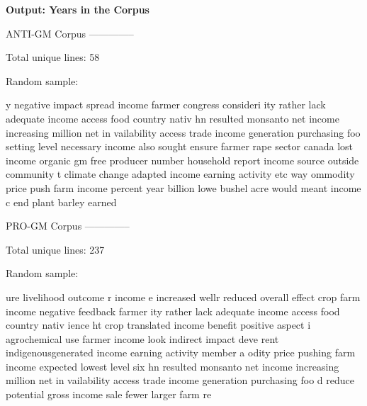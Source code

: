 \textbf{Output: Years in the Corpus}

\begin{footnotesize}

ANTI-GM Corpus\newline
--------------

Total unique lines: 58

Random sample:

y negative impact spread income farmer congress consideri\newline
ity rather lack adequate income access food country nativ\newline
hn resulted monsanto net income increasing million net in\newline
vailability access trade income generation purchasing foo\newline
 setting level necessary income also sought ensure farmer\newline
 rape sector canada lost income organic gm free producer \newline
 number household report income source outside community \newline
t climate change adapted income earning activity etc way \newline
ommodity price push farm income percent year billion lowe\newline
 bushel acre would meant income c end plant barley earned

PRO-GM Corpus\newline
--------------

Total unique lines: 237

Random sample:

ure livelihood outcome r income e increased wellr reduced\newline
overall effect crop farm income negative feedback farmer \newline
ity rather lack adequate income access food country nativ\newline
ience ht crop translated income benefit positive aspect i\newline
 agrochemical use farmer income look indirect impact deve\newline
rent indigenousgenerated income earning activity member a\newline
odity price pushing farm income expected lowest level six\newline
hn resulted monsanto net income increasing million net in\newline
vailability access trade income generation purchasing foo\newline
d reduce potential gross income sale fewer larger farm re

\end{footnotesize}

